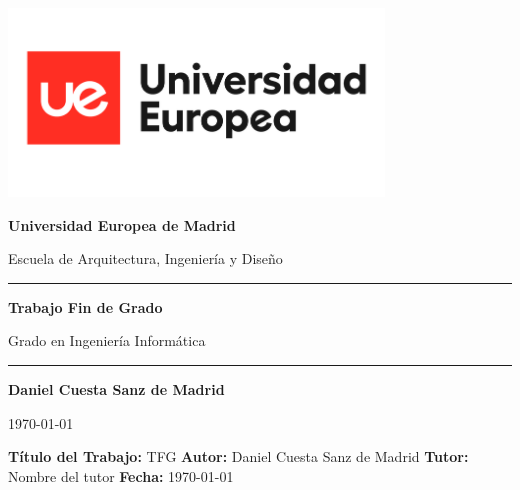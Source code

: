 
\begin{titlepage}
    \centering
    \vspace{1cm}
    
    \includegraphics[height=5cm]{logo.png} 
    \vspace{1cm}
    
    {\LARGE \textbf{Universidad Europea de Madrid} \par}
    {\Large Escuela de Arquitectura, Ingeniería y Diseño \par}
    
    \vspace{3cm}
    
    \noindent\rule{12cm}{1.5pt}
    
    \vspace{0.8cm}
    
    {\huge \textbf{Trabajo Fin de Grado} \par}
    
    \vspace{0.5cm}
    
    {\Large Grado en Ingeniería Informática \par}
    
    \vspace{0.8cm}
    
    \noindent\rule{12cm}{1.5pt}
    
    \vfill
    
    {\Large \textbf{Daniel Cuesta Sanz de Madrid} \par}
    
    \vspace{1cm}
    
    {\large \today \par}
    
\end{titlepage}

\setcounter{page}{1}
\newpage


\textbf{\Large Título del Trabajo:} \Large TFG
\bigbreak
\textbf{\Large Autor:} {\Large Daniel Cuesta Sanz de Madrid}
\bigbreak
\textbf{\Large Tutor:} {\Large Nombre del tutor}
\bigbreak
\textbf{\Large Fecha:} \today 
\bigbreak

\normalsize 
\newpage